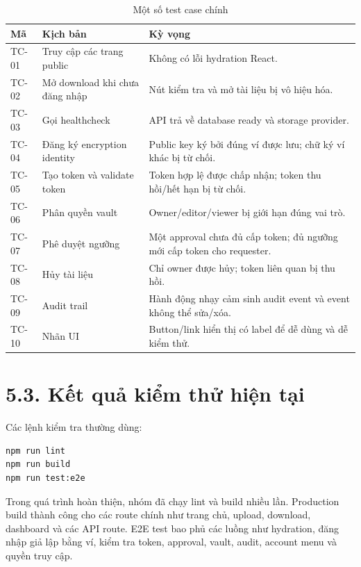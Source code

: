 \begin{longtable}{|p{2cm}|p{5.4cm}|p{5.8cm}|}
\caption{Một số test case chính} \\
\hline
\textbf{Mã} & \textbf{Kịch bản} & \textbf{Kỳ vọng} \\ \hline
TC-01 & Truy cập các trang public & Không có lỗi hydration React. \\ \hline
TC-02 & Mở download khi chưa đăng nhập & Nút kiểm tra và mở tài liệu bị vô hiệu hóa. \\ \hline
TC-03 & Gọi healthcheck & API trả về database ready và storage provider. \\ \hline
TC-04 & Đăng ký encryption identity & Public key ký bởi đúng ví được lưu; chữ ký ví khác bị từ chối. \\ \hline
TC-05 & Tạo token và validate token & Token hợp lệ được chấp nhận; token thu hồi/hết hạn bị từ chối. \\ \hline
TC-06 & Phân quyền vault & Owner/editor/viewer bị giới hạn đúng vai trò. \\ \hline
TC-07 & Phê duyệt ngưỡng & Một approval chưa đủ cấp token; đủ ngưỡng mới cấp token cho requester. \\ \hline
TC-08 & Hủy tài liệu & Chỉ owner được hủy; token liên quan bị thu hồi. \\ \hline
TC-09 & Audit trail & Hành động nhạy cảm sinh audit event và event không thể sửa/xóa. \\ \hline
TC-10 & Nhãn UI & Button/link hiển thị có label để dễ dùng và dễ kiểm thử. \\ \hline
\end{longtable}

\section*{5.3. Kết quả kiểm thử hiện tại}
{}

Các lệnh kiểm tra thường dùng:

\begin{lstlisting}[language=bash]
npm run lint
npm run build
npm run test:e2e
\end{lstlisting}

Trong quá trình hoàn thiện, nhóm đã chạy lint và build nhiều lần. Production build thành công cho các route chính như trang chủ, upload, download, dashboard và các API route. E2E test bao phủ các luồng như hydration, đăng nhập giả lập bằng ví, kiểm tra token, approval, vault, audit, account menu và quyền truy cập.

